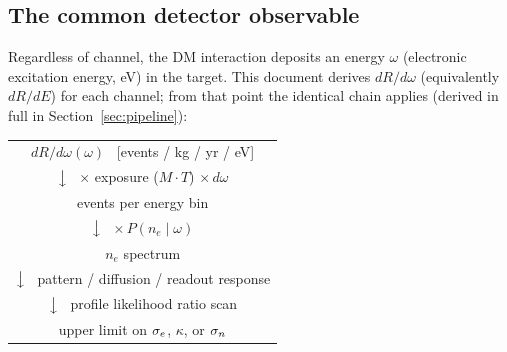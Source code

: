 \subsection{The common detector observable}

Regardless of channel, the DM interaction deposits an energy $\omega$
(electronic excitation energy, eV) in the target. This document derives
$dR/d\omega$ (equivalently $dR/dE$) for each channel; from that point the
identical chain applies (derived in full in Section~\ref{sec:pipeline}):

\begin{center}
\begin{tabular}{@{}c@{}}
$dR/d\omega(\omega)$ \ [events / kg / yr / eV] \\
$\big\downarrow$ \ $\times$ exposure ($M\cdot T$) $\times\, d\omega$ \\
events per energy bin \\
$\big\downarrow$ \ $\times\, P(n_e \mid \omega)$  \\
$n_e$ spectrum \\
$\big\downarrow$ \ pattern / diffusion / readout response  \\
$\big\downarrow$ \ profile likelihood ratio scan \quad [PLR] \\
upper limit on $\sigma_e$, $\kappa$, or $\sigma_n$
\end{tabular}
\end{center}

